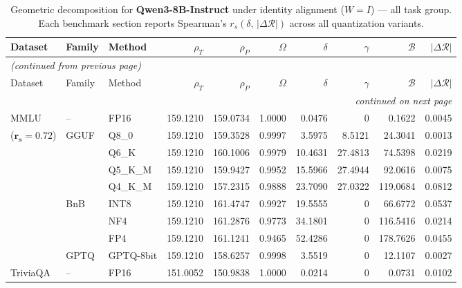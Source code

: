 \begingroup
\small
\setlength{\tabcolsep}{4pt}
\renewcommand{\arraystretch}{1.05}
\setlength{\LTcapwidth}{\textwidth}
\begin{longtable}{ll l rrrrrrr}
\caption{Geometric decomposition for \textbf{Qwen3-8B-Instruct} under identity alignment ($W{=}I$) --- all task group. Each benchmark section reports Spearman's $r_s(\delta,\,|\Delta\mathcal{R}|)$ across all quantization variants.}\label{tab:qwen_instruct_decomposition_all}\\
\toprule
Dataset & Family & Method & $\rho_T$ & $\rho_P$ & $\Omega$ & $\delta$ & $\gamma$ & $\mathcal{B}$ & $|\Delta\mathcal{R}|$ \\
\midrule
\endfirsthead
\multicolumn{10}{l}{\small\itshape (continued from previous page)}\\
\toprule
Dataset & Family & Method & $\rho_T$ & $\rho_P$ & $\Omega$ & $\delta$ & $\gamma$ & $\mathcal{B}$ & $|\Delta\mathcal{R}|$ \\
\midrule
\endhead
\midrule
\multicolumn{10}{r}{\small\itshape continued on next page}\\
\endfoot
\bottomrule
\endlastfoot
MMLU & -- & FP16 & 159.1210 & 159.0734 & 1.0000 & 0.0476 & \cellcolor{cyan!12} $0$ & 0.1622 & 0.0045 \\
{\small ($\mathbf{r_s{=}0.72}$)} & GGUF & Q8\_0 & 159.1210 & 159.3528 & 0.9997 & 3.5975 & 8.5121 & 24.3041 & 0.0013 \\
 &  & Q6\_K & 159.1210 & 160.1006 & 0.9979 & 10.4631 & 27.4813 & 74.5398 & 0.0219 \\
 &  & Q5\_K\_M & 159.1210 & 159.9427 & 0.9952 & 15.5966 & 27.4944 & 92.0616 & 0.0075 \\
 &  & Q4\_K\_M & 159.1210 & 157.2315 & 0.9888 & 23.7090 & 27.0322 & 119.0684 & 0.0812 \\
 & BnB & INT8 & 159.1210 & 161.4747 & 0.9927 & 19.5555 & \cellcolor{cyan!12} $0$ & 66.6772 & 0.0537 \\
 &  & NF4 & 159.1210 & 161.2876 & 0.9773 & 34.1801 & \cellcolor{cyan!12} $0$ & 116.5416 & 0.0214 \\
 &  & FP4 & 159.1210 & 161.1241 & \cellcolor{red!18} 0.9465 & \cellcolor{red!18} 52.4286 & \cellcolor{cyan!12} $0$ & \cellcolor{red!18} 178.7626 & \cellcolor{red!18} 0.0455 \\
 & GPTQ & GPTQ-8bit & 159.1210 & 158.6257 & 0.9998 & 3.5519 & \cellcolor{cyan!12} $0$ & 12.1107 & 0.0027 \\
\midrule
TriviaQA & -- & FP16 & 151.0052 & 150.9838 & 1.0000 & 0.0214 & \cellcolor{cyan!12} $0$ & 0.0731 & 0.0102 \\

\end{longtable}
